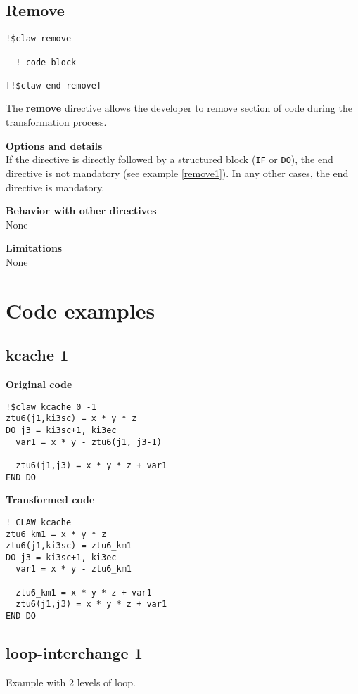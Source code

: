 \documentclass{article}
\begin{document}
\subsection{Remove}
\begin{lstlisting}
!$claw remove

  ! code block
  
[!$claw end remove]
\end{lstlisting}

The \textbf{remove} directive allows the developer to remove section of code
during the transformation process. 

\textbf{Options and details}\\
If the directive is directly followed by a structured block (\lstinline!IF! or \lstinline!DO!), the
end directive is not mandatory (see example \ref{remove1}). In any other cases, the end
directive is mandatory.

\textbf{Behavior with other directives}\\
None

\textbf{Limitations}\\
None


\appendix

\section{Code examples}

\subsection{kcache 1}
\label{kcache1}

\textbf{Original code}
\begin{lstlisting}
!$claw kcache 0 -1
ztu6(j1,ki3sc) = x * y * z
DO j3 = ki3sc+1, ki3ec
  var1 = x * y - ztu6(j1, j3-1)

  ztu6(j1,j3) = x * y * z + var1
END DO
\end{lstlisting}


\textbf{Transformed code}
\begin{lstlisting}
! CLAW kcache
ztu6_km1 = x * y * z
ztu6(j1,ki3sc) = ztu6_km1
DO j3 = ki3sc+1, ki3ec
  var1 = x * y - ztu6_km1

  ztu6_km1 = x * y * z + var1
  ztu6(j1,j3) = x * y * z + var1
END DO
\end{lstlisting}




\subsection{loop-interchange 1}
\label{loop-interchange1}
Example with 2 levels of loop. 
\end{document}
